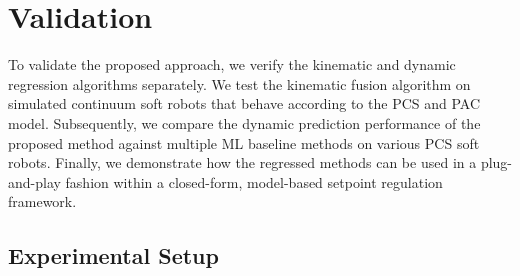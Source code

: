 \section{Validation}
To validate the proposed approach, we verify the kinematic and dynamic regression algorithms separately.
We test the kinematic fusion algorithm on simulated continuum soft robots that behave according to the \gls{PCS} and \gls{PAC} model.
Subsequently, we compare the dynamic prediction performance of the proposed method against multiple \gls{ML} baseline methods on various \gls{PCS} soft robots.
Finally, we demonstrate how the regressed methods can be used in a plug-and-play fashion within a closed-form, model-based setpoint regulation framework.


\subsection{Experimental Setup}


